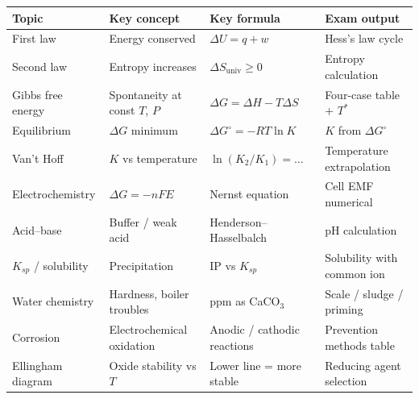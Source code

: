 \documentclass[12pt,a4paper]{article}
\begin{document}
\begin{tcolorbox}[tikzbox, title={Summary Reference Table --- Module 4}]
\begin{tabularx}{\linewidth}{|B{2.6cm}|Y|Y|Y|}
\hline
\textbf{Topic} & \textbf{Key concept} & \textbf{Key formula} & \textbf{Exam output} \\
\hline
First law & Energy conserved & $\Delta U = q + w$ & Hess's law cycle \\
\hline
Second law & Entropy increases & $\Delta S_{\mathrm{univ}} \geq 0$ & Entropy calculation \\
\hline
Gibbs free energy & Spontaneity at const $T$, $P$ & $\Delta G = \Delta H - T\Delta S$ & Four-case table + $T^*$ \\
\hline
Equilibrium & $\Delta G$ minimum & $\Delta G^\circ = -RT\ln K$ & $K$ from $\Delta G^\circ$ \\
\hline
Van't Hoff & $K$ vs temperature & $\ln(K_2/K_1) = \ldots$ & Temperature extrapolation \\
\hline
Electrochemistry & $\Delta G = -nFE$ & Nernst equation & Cell EMF numerical \\
\hline
Acid--base & Buffer / weak acid & Henderson--Hasselbalch & pH calculation \\
\hline
$K_{sp}$ / solubility & Precipitation & IP vs $K_{sp}$ & Solubility with common ion \\
\hline
Water chemistry & Hardness, boiler troubles & ppm as CaCO$_3$ & Scale / sludge / priming \\
\hline
Corrosion & Electrochemical oxidation & Anodic / cathodic reactions & Prevention methods table \\
\hline
Ellingham diagram & Oxide stability vs $T$ & Lower line = more stable & Reducing agent selection \\
\hline
\end{tabularx}
\end{tcolorbox}
\end{document}
